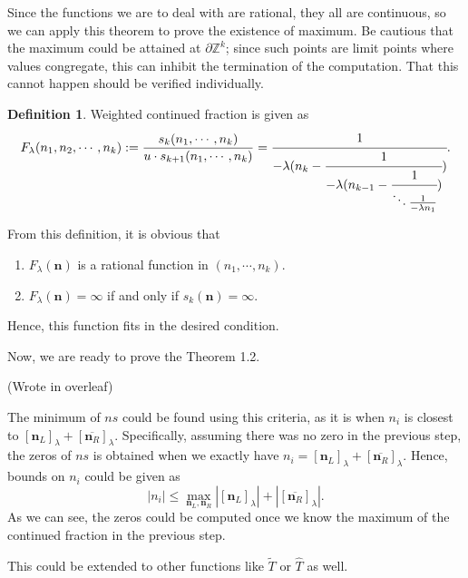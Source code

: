 \documentclass{article}
\theoremstyle{definition}
\newtheorem*{definition}{Definition}
\theoremstyle{plain}
\theoremstyle{remark}
\numberwithin{equation}{section}
\newcommand{\bZ}{\mathbb{Z}}
\newcommand{\abs}[1]{\left\lvert{#1}\right\rvert}
\begin{document}
Since the functions we are to deal with are rational,
they all are continuous, so we can apply this theorem to prove the existence of maximum.
Be cautious that the maximum could be attained at $\partial \bZ^k$;
since such points are limit points where values congregate, this can inhibit the termination of the computation.
That this cannot happen should be verified individually.

\begin{definition}
  Weighted continued fraction is given as
  \[
    F_\lambda(n_1, n_2, \cdots, n_k)
    := \frac{s_k(n_1, \cdots, n_k)}{u \cdot s_{k+1}(n_1, \cdots, n_k)}
    = \cfrac{1}{-\lambda (n_k - \cfrac{1}{-\lambda (n_{k-1} - \cfrac{1}{\ddots \frac{1}{-\lambda n_1}})})}.
  \]
\end{definition}

From this definition, it is obvious that
\begin{enumerate}
  \item $F_\lambda(\mathbf{n})$ is a rational function in $(n_1, \cdots, n_k)$.
  \item $F_\lambda(\mathbf{n}) = \infty$ if and only if $s_k(\mathbf{n}) = \infty$.
\end{enumerate}
Hence, this function fits in the desired condition.

\def\ns {\mathbf{n}}
\def\nsL {\mathbf{n}_L}
\def\nsR {\mathbf{n}_R}

Now, we are ready to prove the Theorem 1.2.

(Wrote in overleaf)

The minimum of $ns$ could be found using this criteria,
as it is when $n_i$ is closest to $[\nsL]_\lambda + [\overline{\nsR}]_\lambda$.
Specifically, assuming there was no zero in the previous step,
the zeros of $ns$ is obtained when we exactly have
$n_i = [\nsL]_\lambda + [\overline{\nsR}]_\lambda$.
Hence, bounds on $n_i$ could be given as
\[ \abs{n_i} \leq \max_{\nsL, \nsR} \abs{[\nsL]_\lambda} + \abs{[\overline{\nsR}]_\lambda}. \]
As we can see,
the zeros could be computed once we know the maximum of the continued fraction in the previous step.

This could be extended to other functions like $\tilde{T}$ or $\hat{T}$ as well.
\end{document}
